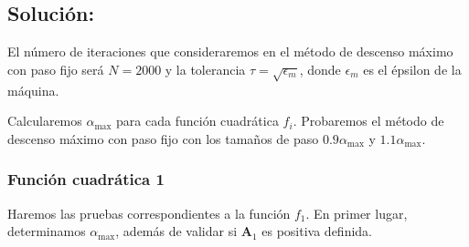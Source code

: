 \documentclass[11pt]{article}
\begin{document}
\hypertarget{soluciuxf3n}{%
\subsection{Solución:}\label{soluciuxf3n}}

    El número de iteraciones que consideraremos en el método de descenso
máximo con paso fijo será \(N=2000\) y la tolerancia
\(\tau=\sqrt{\epsilon_m}\), donde \(\epsilon_m\) es el épsilon de la
máquina.

Calcularemos \(\alpha_{\max}\) para cada función cuadrática \(f_i\).
Probaremos el método de descenso máximo con paso fijo con los tamaños de
paso \(0.9\alpha_{\max}\) y \(1.1\alpha_{\max}\).

\hypertarget{funciuxf3n-cuadruxe1tica-1}{%
\subsubsection{Función cuadrática 1}\label{funciuxf3n-cuadruxe1tica-1}}

Haremos las pruebas correspondientes a la función \(f_1\). En primer
lugar, determinamos \(\alpha_{\max}\), además de validar si
\(\mathbf{A}_1\) es positiva definida.
\end{document}
